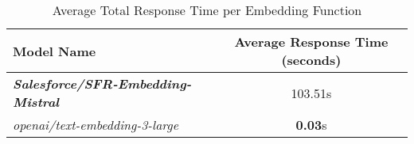 
\begin{table}[H]
\centering
\begin{tabular}{@{}lc@{}}
\toprule
Model Name & Average Response Time (seconds) \\
\midrule
\textbf{\textit{Salesforce/SFR-Embedding-Mistral}} & 103.51s \\
\textit{openai/text-embedding-3-large} & \textbf{0.03}s \\

\bottomrule
\end{tabular}
\caption{Average Total Response Time per Embedding Function}
\label{tab:average_response_time}
\end{table}
